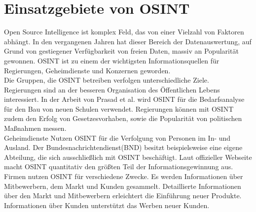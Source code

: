 \documentclass[twoside,a4paper]{article}
\begin{document}
\section{Einsatzgebiete von OSINT}
Open Source Intelligence ist komplex Feld, das von einer Vielzahl von Faktoren abhängt. In den vergangenen Jahren hat dieser Bereich der Datenauswertung, auf Grund von gestiegener Verfügbarkeit von freien Daten, massiv an Popularität gewonnen. OSINT ist zu einem der wichtigsten Informationsquellen für Regierungen, Geheimdienste und Konzernen geworden.\\
Die Gruppen, die OSINT betreiben verfolgen unterschiedliche Ziele.\\
Regierungen sind an der besseren Organisation des Öffentlichen Lebens interessiert. In der Arbeit von Prasad et al.\cite{data_consolidation_solution} wird OSINT für die Bedarfsanalyse für den Bau von neuen Schulen verwendet. Regierungen können mit OSINT zudem den Erfolg von Gesetzesvorhaben, sowie die Popularität von politischen Maßnahmen messen.\\
Geheimdienste Nutzen OSINT für die Verfolgung von Personen im In- und Ausland. Der Bundesnachrichtendienst(BND) besitzt beispielsweise eine eigene Abteilung, die sich ausschließlich mit OSINT beschäftigt. Laut offizieller Webseite\cite{bndOsint} macht OSINT quantitativ den größten Teil der Informationsgewinnung aus.\\
Firmen nutzen OSINT für verschiedene Zwecke. Es werden Informationen über Mitbewerbern, dem Markt und Kunden gesammelt. Detaillierte  Informationen über den Markt und Mitbewerbern erleichtert die Einführung neuer Produkte. Informationen über Kunden unterstützt das Werben neuer Kunden.
\end{document}
